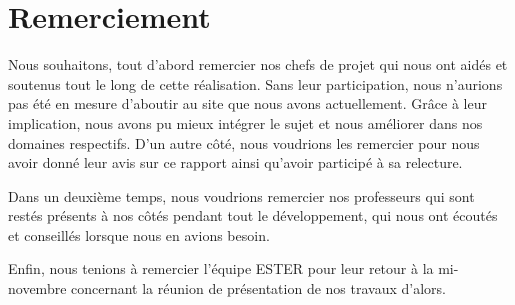 \chapter*{Remerciement}

Nous souhaitons, tout d'abord remercier nos chefs de projet qui nous ont aidés et soutenus tout le long de cette réalisation. Sans leur participation, nous n'aurions pas été en mesure d'aboutir au site que nous avons actuellement. Grâce à leur implication, nous avons pu mieux intégrer le sujet et nous améliorer dans nos domaines respectifs. 
D'un autre côté, nous voudrions les remercier pour nous avoir donné leur avis sur ce rapport ainsi qu'avoir participé à sa relecture.\

Dans un deuxième temps, nous voudrions remercier nos professeurs qui sont restés présents à nos côtés pendant tout le développement, qui nous ont écoutés et conseillés lorsque nous en avions besoin. \

Enfin, nous tenions à remercier l'équipe ESTER pour leur retour à la mi-novembre concernant la réunion de présentation de nos travaux d'alors. 